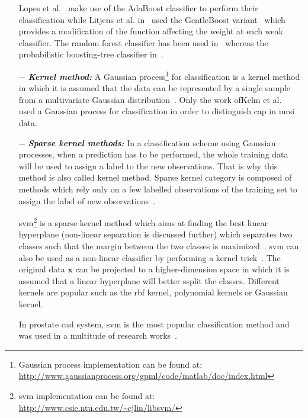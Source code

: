 \begin{enumerate}[leftmargin=*]
  Lopes et al.~\cite{Lopes2011} make use of the AdaBoost classifier to perform their classification while Litjens et al. in~\cite{Litjens2014} used the GentleBoost variant~\cite{Friedman1998} which provides a modification of the function affecting the weight at each weak classifier. The random forest classifier has been used in~\cite{Kelm2007,Litjens2014,Tiwari2012,Tiwari2013,Viswanath2009} whereas the probabilistic boosting-tree classifier in~\cite{Tiwari2009a,Tiwari2012,Tiwari2010,Viswanath2011}.

\item[$-$] \textbf{\textit{Kernel method:}} A Gaussian process\footnote{Gaussian process implementation can be found at: \url{http://www.gaussianprocess.org/gpml/code/matlab/doc/index.html}} for classification is a kernel method in which it is assumed that the data can be represented by a single sample from a multivariate Gaussian distribution~\cite{Rasmussen2005}. Only the work ofKelm et al.~\cite{Kelm2007} used a Gaussian process for classification in order to distinguish \ac{cap} in \ac{mrsi} data.

\item[$-$] \textbf{\textit{Sparse kernel methods:}} In a classification scheme using Gaussian processes, when a prediction has to be performed, the whole training data will be used to assign a label to the new observations. That is why this method is also called kernel method. Sparse kernel category is composed of methods which rely only on a few labelled observations of the training set to assign the label of new observations~\cite{Bishop2006}.

  \Acf{svm}\footnote{\ac{svm} implementation can be found at: \url{http://www.csie.ntu.edu.tw/~cjlin/libsvm/}} is a sparse kernel method which aims at finding the best linear hyperplane (non-linear separation is discussed further) which separates two classes such that the margin between the two classes is maximized~\cite{Vapnik1963}. \ac{svm} can also be used as a non-linear classifier by performing a kernel trick~\cite{Boser1992}. The original data $\mathbf{x}$ can be projected to a higher-dimension space in which it is assumed that a linear hyperplane will better ssplit the classes. Different kernels are popular such as the \ac{rbf} kernel, polynomial kernels or Gaussian kernel.

  In prostate \ac{cad} system, \ac{svm} is the most popular classification method and was used in a multitude of research works~\cite{Artan2009,Artan2010,Chan2003,Kelm2007,Litjens2011,Litjens2012,Liu2013,Lopes2011,Niaf2011,Niaf2012,Ozer2009,Ozer2010,Parfait2012,Peng2013,Sung2011,Tiwari2012,Vos2008,Vos2008a,Vos2010,Vos2012}.


\end{enumerate}
